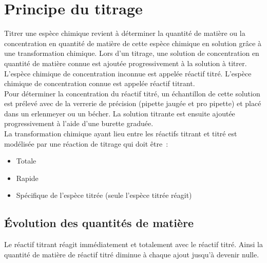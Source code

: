 \documentclass[a4paper,11pt,fleqn]{article}%
\begin{document}
	\maketitle

\section{Principe du titrage}
Titrer une espèce chimique revient à déterminer la quantité de matière ou la concentration en quantité de matière de cette espèce chimique en solution grâce à une transformation chimique. Lors d’un titrage, une solution de concentration en quantité de matière connue est ajoutée progressivement à la solution à titrer.\\
L’espèce chimique de concentration inconnue est appelée réactif titré. L’espèce chimique de concentration connue est appelée réactif titrant.\\
Pour déterminer la concentration du réactif titré, un échantillon de cette solution est prélevé avec de la verrerie de précision (pipette jaugée et pro pipette) et placé dans un erlenmeyer ou un bécher. La solution titrante est ensuite ajoutée progressivement à l’aide d’une burette graduée.\\
La transformation chimique ayant lieu entre les réactifs titrant et titré est modélisée par une réaction de titrage qui doit être :
\begin{itemize}
	\item Totale
	\item Rapide
	\item Spécifique de l'espèce titrée (seule l'espèce titrée réagit)
\end{itemize}

	\subsection{Évolution des quantités de matière}
	\begin{definition}
		Le réactif titrant réagit immédiatement et totalement avec le réactif titré. Ainsi la quantité de matière de réactif titré diminue à chaque ajout jusqu’à devenir nulle.
	\end{definition}
\end{document}
